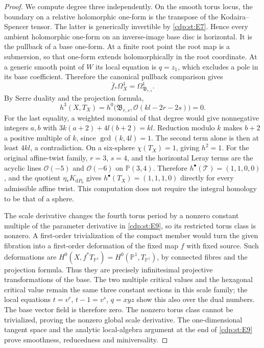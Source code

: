 \begin{proof}
We compute degree three independently. On the smooth torus locus,
the boundary on a relative holomorphic one-form is the transpose
of the Kodaira--Spencer tensor. The latter is generically invertible
by \ref{cdp:st:E7}. Hence every ambient holomorphic one-form on an inverse-image
base disc is horizontal. It is the pullback of a base one-form.
At a finite root point the root map is a submersion, so that
one-form extends holomorphically in the root coordinate. At a
generic smooth point of $W$ its local equation is $q=z_1$, which
excludes a pole in its base coefficient. Therefore the canonical
pullback comparison gives
\[
 \bar f_*\Omega_X^1=\Omega_{\mathfrak B_{r,s}}^1.
\]
By Serre duality and the projection formula,
\[
 h^3(X,T_X)=h^0\bigl(\mathfrak B_{r,s},
                         \mathcal O(kl-2r-2s)\bigr)=0.
\]
For the last equality, a weighted monomial of that degree would
give nonnegative integers $a,b$ with
$3k(a+2)+4l(b+2)=kl$. Reduction modulo $k$ makes $b+2$ a positive
multiple of $k$, since $\gcd(k,4l)=1$. The second term alone
is then at least $4kl$, a contradiction. On a six-sphere
$\chi(T_X)=1$, giving $h^2=1$. For the original affine-twist
family, $r=3$, $s=4$, and the horizontal Leray terms are the
acyclic lines $\mathcal O(-5)$ and $\mathcal O(-6)$ on
$\mathbb P(3,4)$. Therefore $h^\bullet(\mathcal T)=(1,1,0,0)$,
and the quotient $\eta_*K_{\mathrm dP_6}$ gives
$h^\bullet(T_X)=(1,1,1,0)$ directly for every admissible affine
twist. This computation does not require the integral homology
to be that of a sphere.

The scale derivative changes the fourth torus period by a nonzero
constant multiple of the parameter derivative in \ref{cdp:st:E9}, so its
restricted torus class is nonzero. A first-order trivialization of
the compact member would turn the given fibration into a
first-order deformation of the fixed map $f$ with fixed source.
Such deformations are $H^0(X,f^*T_{\mathbb P^1})
=H^0(\mathbb P^1,T_{\mathbb P^1})$, by connected fibres and
the projection formula. Thus they are precisely infinitesimal
projective transformations of the base. The two multiple critical
values and the hexagonal critical value remain the same three
constant sections in this scale family; the local equations
$t=v^r$, $t-1=v^s$, $q=xyz$ show this also over the dual numbers.
The base vector field is therefore zero. The nonzero torus class
cannot be trivialized, proving the nonzero global scale derivative.
The one-dimensional tangent space and the analytic local-algebra
argument at the end of \ref{cdp:st:E9} prove smoothness, reducedness and
miniversality.
\end{proof}


